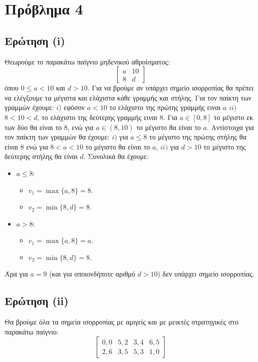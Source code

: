\section{Πρόβλημα 4}

\subsection{Ερώτηση (i)}

Θεωρούμε το παρακάτω παίγνιο μηδενικού αθροίσματος:
$$
    \begin{bmatrix}
        a & 10 \\
        8 & d
    \end{bmatrix}
$$
όπου $0 \leq a < 10$ και $d > 10$. Για να βρούμε αν υπάρχει σημείο ισορροπίας
θα πρέπει να ελέγξουμε τα μέγιστα και ελάχιστα κάθε γραμμής και στήλης. Για τον
παίκτη των γραμμών έχουμε: $i)$ εφόσον $a < 10$ το ελάχιστο της πρώτης γραμμής
ειναι $a$ $ii)$ $8 < 10 < d$, το ελάχιστο της δεύτερης γραμμής ειναι
$8$. Για $a \in [0, 8]$ το μέγιστο εκ των δύο θα είναι το $8$, ενώ για
$a \in (8, 10)$ το μέγιστο θα είναι το $a$. Αντίστοιχα για τον παίκτη των
γραμμών θα έχουμε: $i)$ για $a \leq 8$ το μέγιστο της πρώτης στήλης θα είναι $8$
ενώ για $8 < a < 10$ το μέγιστο θα είναι το $a$, $ii)$ για $d > 10$ το μέγιστο
της δεύτερης στήλης θα είναι $d$. Συνολικά θα έχουμε:
\begin{itemize}
    \item $a \leq 8$:
        \begin{itemize}
            \item $v_1 = \max \{a, 8 \} = 8$.
            \item $v_2 = \min \{8, d \} = 8$.
        \end{itemize}
    \item $a > 8$:
        \begin{itemize}
            \item $v_1 = \max \{a, 8 \} = a$.
            \item $v_2 = \min \{8, d \} = 8$.
        \end{itemize}
\end{itemize}
Άρα για $a = 9$ (και για οποιονδήποτε αριθμό $d > 10$) δεν υπάρχει σημείο
ισορροπίας.

\subsection{Ερώτηση (ii)}

Θα βρούμε όλα τα σημεία ισορροπίας με αμιγείς και με μεικτές στρατηγικές στο
παρακάτω παίγνιο:
$$
  \begin{bmatrix}
    0, 0 & 5, 2 & 3, 4 & 6, 5 \\
    2, 6 & 3, 5 & 5, 3 & 1, 0
  \end{bmatrix}
$$

